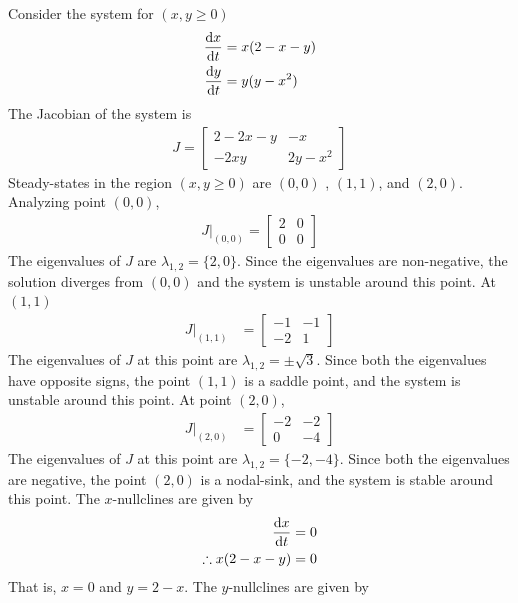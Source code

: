 \documentclass[11pt,1in]{article}
\newenvironment{Example}[2][Example]{\begin{trivlist}
		\item[\hskip \labelsep {\bfseries #1}\hskip \labelsep {\bfseries #2.}]}{\end{trivlist}}
\begin{document}
\begin{Example}{2}
	\cite[p.~488]{diff_eq}
	Consider the system for $(x,y \geq 0)$
	\begin{align*}
	\derivative{x}{t} &= x(2 - x - y)\\
	\derivative{y}{t} &= y(y - x^2)
	\end{align*}
	The Jacobian of the system is
	\begin{align*}
	J = \begin{bmatrix}
	2 -2x  -y & -x \\
	-2xy & 2y - x^2 
	\end{bmatrix}
	\end{align*}
	Steady-states in the region $(x,y \geq 0)$ are $(0,0)$ , $(1,1)$, and $(2,0)$. Analyzing point $(0,0)$,
	\begin{align*}
	J|_{(0,0)} = \begin{bmatrix}
	2 & 0 \\
	0 & 0
	\end{bmatrix}
	\end{align*}
	The eigenvalues of $J$ are $\lambda_{1,2} = \{2, 0\}$. Since the eigenvalues are non-negative, the solution diverges from $(0,0)$ and the system is unstable around this point. 
	At $(1,1)$
	\begin{align*}
	J|_{(1,1)} &= \begin{bmatrix}
	-1 & -1 \\
	-2 & 1
	\end{bmatrix}
	\end{align*}
	The eigenvalues of $J$ at this point are $\lambda_{1,2} = \pm \sqrt{3}$. Since both the eigenvalues have opposite signs, the point $(1,1)$ is a saddle point, and the system is unstable around this point. At point $(2,0)$,
	\begin{align*} J|_{(2,0)} &=
	\begin{bmatrix}
	-2 & -2 \\
	0 & - 4
	\end{bmatrix}
	\end{align*} 
	The eigenvalues of $J$ at this point are $\lambda_{1,2} = \{-2,-4\}$. Since both the eigenvalues are negative, the point $(2,0)$ is a nodal-sink, and the system is stable around this point. The $x$-nullclines are given by 
	\begin{align*}
	\derivative{x}{t} &= 0 \\
	\therefore x(2 - x - y) &= 0
	\end{align*}
	That is, $x = 0$ and $y = 2 - x$. The $y$-nullclines are given by 
	\begin{align*}

\end{align*}
\end{Example}
\end{document}
